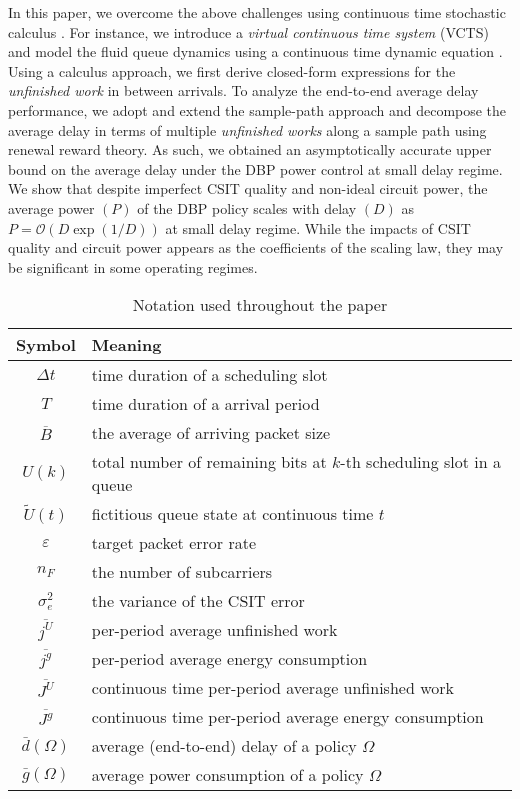 \documentclass[11pt,journal, onecolumn]{./IEEEtran}
\newcommand{\red}{\color{black}}
\begin{document}
In this paper, we overcome the above challenges using continuous time stochastic calculus \cite{kushner_numerical_2001, bertsekas_dynamic_2007}. For instance, we introduce a {\em virtual continuous time system} (VCTS) and model the fluid queue dynamics using a continuous time dynamic equation \cite{zafer_calculus_2005, zafer_minimum_2009}. Using a calculus approach, we first derive closed-form expressions for the {\em unfinished work} in between arrivals. To analyze the end-to-end average delay performance, we adopt and extend the sample-path approach \cite{bertsekas_dynamic_2007} and decompose the average delay in terms of multiple {\em \red unfinished works} along a sample path using renewal reward theory. As such, we obtained an asymptotically accurate upper bound on the average delay under the DBP power control at small delay regime. We show that despite imperfect CSIT quality and non-ideal circuit power, the average power $(P)$ of the DBP policy scales with delay $(D)$ as $P=\mathcal O(D \exp(1/D))$ at small delay regime. {\red While the impacts of CSIT quality and circuit power appears as the coefficients of the scaling law, they may be significant in some operating regimes.}
\begin{table}[b!]
\renewcommand{\arraystretch}{0.6}
\caption{Notation used throughout the paper}
\label{tab_not}
\centering
\begin{tabular}{|c|l|} \hline
{Symbol}& {Meaning}   \\

\hline
$\Delta t$  & time duration of a scheduling slot\\
$T$  & time duration of a arrival period\\
$\overline B$  & the average of arriving packet size\\
$U(k)$   & total number of remaining bits at $k$-th scheduling slot in a queue\\
$\widetilde U(t)$   & fictitious queue state at continuous time $t$\\
$\varepsilon$  & target packet error rate \\
$n_F$  & the number of subcarriers\\
$\sigma^2_e$  & the variance of the CSIT error \\
$\overline {{j^U}}$   & per-period average unfinished work   \\
 $\overline {{j^g}}$  & per-period average energy consumption  \\
 $\overline {{J^U}}$  & continuous time per-period average unfinished work \\
 $\overline {{J^g}}$  & continuous time per-period average energy consumption \\
 $\bar d(\Omega)$  & average (end-to-end) delay of a policy $\Omega$\\
 $\bar g(\Omega)$  & average power consumption of a policy $\Omega$ \\
\hline
\end{tabular}
\end{table}
\end{document}
